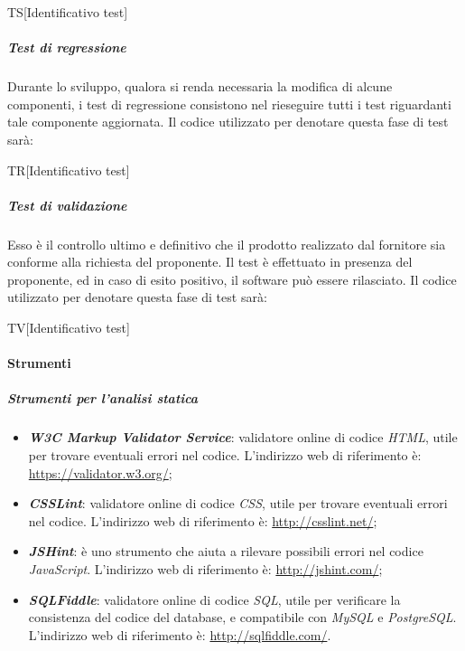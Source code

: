 		\begin{center}
			TS[Identificativo test]
		\end{center}
	
		\subparagraph{Test di regressione}
		Durante lo sviluppo, qualora si renda necessaria la modifica di alcune componenti, i test di regressione consistono nel rieseguire tutti i test riguardanti tale componente aggiornata. Il codice utilizzato per denotare questa fase di test sarà:
		
		\begin{center}
			TR[Identificativo test]
		\end{center}
	
		\subparagraph{Test di validazione}
		Esso è il controllo ultimo e definitivo che il prodotto realizzato dal fornitore sia conforme alla richiesta del proponente. Il test è effettuato in presenza del proponente, ed in caso di esito positivo, il software può essere rilasciato.
		Il codice utilizzato per denotare questa fase di test sarà:
		
		\begin{center}
			TV[Identificativo test]
		\end{center}
			
		\paragraph{Strumenti}
		
		\subparagraph{Strumenti per l'analisi statica}
		
		\begin{itemize}
			\item \textbf{\textit{W3C Markup Validator Service}}: validatore online di codice \textit{HTML}, utile per trovare eventuali errori nel codice. L'indirizzo web di riferimento è: \url{https://validator.w3.org/};
			\item \textbf{\textit{CSSLint}}: validatore online di codice \textit{CSS}, utile per trovare eventuali errori nel codice. L'indirizzo web di riferimento è: \url{http://csslint.net/};
			\item \textit{\textbf{JSHint}}: è uno strumento che aiuta a rilevare possibili
			errori nel codice \textit{JavaScript}. L'indirizzo web di riferimento è: \url{http://jshint.com/};
			\item \textbf{\textit{SQLFiddle}}: validatore online di codice \textit{SQL}, utile per verificare la consistenza del codice del database, e compatibile con \textit{MySQL} e \textit{PostgreSQL}. L'indirizzo web di riferimento è: \url{http://sqlfiddle.com/}.
		\end{itemize}
	
